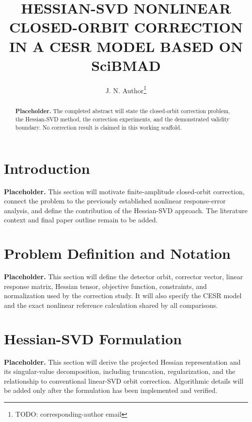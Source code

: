 \documentclass[letterpaper]{jacow}
\begin{document}
\title{HESSIAN-SVD NONLINEAR CLOSED-ORBIT CORRECTION IN A CESR MODEL BASED ON SciBMAD}

\author[1]{J. N. Author\thanks{TODO: corresponding-author email}}

\maketitle

\begin{abstract}
\textbf{Placeholder.} The completed abstract will state the closed-orbit
correction problem, the Hessian-SVD method, the correction experiments, and
the demonstrated validity boundary.  No correction result is claimed in this
working scaffold.
\end{abstract}

\section{Introduction}

\textbf{Placeholder.} This section will motivate finite-amplitude closed-orbit
correction, connect the problem to the previously established nonlinear
response-error analysis, and define the contribution of the Hessian-SVD
approach.  The literature context and final paper outline remain to be added.

\section{Problem Definition and Notation}

\textbf{Placeholder.} This section will define the detector orbit, corrector
vector, linear response matrix, Hessian tensor, objective function, constraints,
and normalization used by the correction study.  It will also specify the CESR
model and the exact nonlinear reference calculation shared by all comparisons.

\section{Hessian-SVD Formulation}

\textbf{Placeholder.} This section will derive the projected Hessian
representation and its singular-value decomposition, including truncation,
regularization, and the relationship to conventional linear-SVD orbit
correction.  Algorithmic details will be added only after the formulation has
been implemented and verified.
\end{document}
